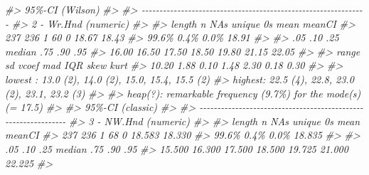 \documentclass[
]{book}
\newenvironment{Shaded}{\begin{snugshade}}{\end{snugshade}}
\newcommand{\CommentTok}[1]{\textcolor[rgb]{0.56,0.35,0.01}{\textit{#1}}}
\begin{document}
\begin{Shaded}
\begin{Highlighting}[]
\CommentTok{\#\textgreater{} \textquotesingle{} 95\%{-}CI (Wilson)}
\CommentTok{\#\textgreater{} }
\CommentTok{\#\textgreater{} {-}{-}{-}{-}{-}{-}{-}{-}{-}{-}{-}{-}{-}{-}{-}{-}{-}{-}{-}{-}{-}{-}{-}{-}{-}{-}{-}{-}{-}{-}{-}{-}{-}{-}{-}{-}{-}{-}{-}{-}{-}{-}{-}{-}{-}{-}{-}{-}{-}{-}{-}{-}{-}{-}{-}{-}{-}{-}{-}{-}{-}{-}{-} }
\CommentTok{\#\textgreater{} 2 {-} Wr.Hnd (numeric)}
\CommentTok{\#\textgreater{} }
\CommentTok{\#\textgreater{}   length      n    NAs  unique     0s   mean  meanCI\textquotesingle{}}
\CommentTok{\#\textgreater{}      237    236      1      60      0  18.67   18.43}
\CommentTok{\#\textgreater{}           99.6\%   0.4\%           0.0\%          18.91}
\CommentTok{\#\textgreater{}                                                     }
\CommentTok{\#\textgreater{}      .05    .10    .25  median    .75    .90     .95}
\CommentTok{\#\textgreater{}    16.00  16.50  17.50   18.50  19.80  21.15   22.05}
\CommentTok{\#\textgreater{}                                                     }
\CommentTok{\#\textgreater{}    range     sd  vcoef     mad    IQR   skew    kurt}
\CommentTok{\#\textgreater{}    10.20   1.88   0.10    1.48   2.30   0.18    0.30}
\CommentTok{\#\textgreater{}                                                     }
\CommentTok{\#\textgreater{} lowest : 13.0 (2), 14.0 (2), 15.0, 15.4, 15.5 (2)}
\CommentTok{\#\textgreater{} highest: 22.5 (4), 22.8, 23.0 (2), 23.1, 23.2 (3)}
\CommentTok{\#\textgreater{} }
\CommentTok{\#\textgreater{} heap(?): remarkable frequency (9.7\%) for the mode(s) (= 17.5)}
\CommentTok{\#\textgreater{} }
\CommentTok{\#\textgreater{} \textquotesingle{} 95\%{-}CI (classic)}
\CommentTok{\#\textgreater{} }
\CommentTok{\#\textgreater{} {-}{-}{-}{-}{-}{-}{-}{-}{-}{-}{-}{-}{-}{-}{-}{-}{-}{-}{-}{-}{-}{-}{-}{-}{-}{-}{-}{-}{-}{-}{-}{-}{-}{-}{-}{-}{-}{-}{-}{-}{-}{-}{-}{-}{-}{-}{-}{-}{-}{-}{-}{-}{-}{-}{-}{-}{-}{-}{-}{-}{-}{-}{-} }
\CommentTok{\#\textgreater{} 3 {-} NW.Hnd (numeric)}
\CommentTok{\#\textgreater{} }
\CommentTok{\#\textgreater{}   length       n     NAs  unique      0s    mean  meanCI\textquotesingle{}}
\CommentTok{\#\textgreater{}      237     236       1      68       0  18.583  18.330}
\CommentTok{\#\textgreater{}            99.6\%    0.4\%            0.0\%          18.835}
\CommentTok{\#\textgreater{}                                                         }
\CommentTok{\#\textgreater{}      .05     .10     .25  median     .75     .90     .95}
\CommentTok{\#\textgreater{}   15.500  16.300  17.500  18.500  19.725  21.000  22.225}
\CommentTok{\#\textgreater{}                                                         }

\end{Highlighting}
\end{Shaded}
\end{document}
